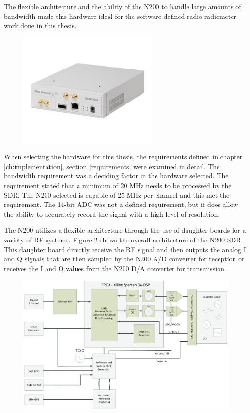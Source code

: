 The flexible architecture and the ability of the N200 to handle large amounts of bandwidth made this hardware ideal for the software defined radio radiometer work done in this thesis.

{\begin{figure}[h!tb] 
\centering
\includegraphics[width=7cm]{Images/n200}
\label{N200}
\end{figure}
}

When selecting the hardware for this thesis, the requirements defined in chapter \ref{ch:implementation}, section \ref{requirements} were examined in detail.  The bandwidth requirement was a deciding factor in the hardware selected.  The requirement stated that a minimum of 20 MHz needs to be processed by the SDR.  The N200 selected is capable of 25 MHz per channel and this met the requirement.  The 14-bit ADC was not a defined requirement, but it does allow the ability to accurately record the signal with a high level of resolution.  

The N200 utilizes a flexible architecture through the use of daughter-boards for a variety of RF systems.  Figure \ref{N200_block} shows the overall architecture of the N200 SDR.  This daughter board directly receive the RF signal and then outputs the analog I and Q signals that are then sampled by the N200 A/D converter for reception or receives the I and Q values from the N200 D/A converter for transmission. 

{\begin{figure}[h!tb] 
\centering
\includegraphics[width=14cm]{Images/n200_block_edited}
\label{N200_block}
\end{figure}
}

